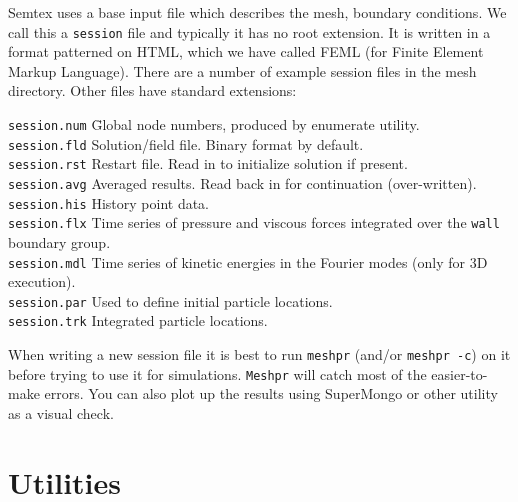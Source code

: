 \documentclass[11pt,a4paper]{report}
\begin{document}
\textsf{Semtex} uses a base input file which describes the mesh,
boundary conditions.  We call this a \verb+session+ file and
typically it has no root extension.  It is written in a format
patterned on HTML, which we have called FEML (for Finite Element
Markup Language).  There are a number of example session files in the
mesh directory.  Other files have standard extensions:
\begin{tabbing}
\texttt{session.num}  \=
        Global node numbers, produced by enumerate utility.\\
\texttt{session.fld}  \>
        Solution/field file.  Binary format by default.\\
\texttt{session.rst}  \>
        Restart file. Read in to initialize solution if present.\\
\texttt{session.avg} \> Averaged results. Read back in for
        continuation (over-written).\\
\texttt{session.his} \> History point data.\\
\texttt{session.flx} \> Time series of pressure and viscous forces
        integrated over the \texttt{wall} boundary group.\\
\texttt{session.mdl} \> Time series of kinetic energies in the Fourier
        modes (only for 3D execution).\\
\texttt{session.par} \> Used to define initial particle locations.\\
\texttt{session.trk} \> Integrated particle locations.\\
\end{tabbing}

When writing a new session file it is best to run \texttt{meshpr}
(and/or \texttt{meshpr -c}) on it before trying to use it for
simulations.  \texttt{Meshpr} will catch most of the easier-to-make
errors.  You can also plot up the results using SuperMongo or other
utility as a visual check.

\section{Utilities}
\end{document}
